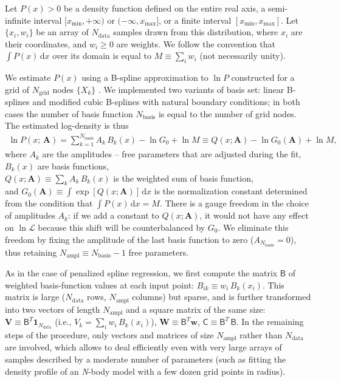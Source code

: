 \documentclass[12pt]{article}
\newcommand{\Nbody}{\textsl{N}-body\xspace}
\renewcommand{\d}{\mathrm{d}}
\newcommand{\bA}{\boldsymbol{A}}
\begin{document}
Let $P(x)>0$ be a density function defined on the entire real axis, a semi-infinite interval $[x_\mathrm{min},+\infty)$ or $(-\infty,x_\mathrm{max}]$, or a finite interval $[x_\mathrm{min},x_\mathrm{max}]$.
Let $\{x_i, w_i\}$ be an array of $N_\mathrm{data}$ samples drawn from this distribution, where $x_i$ are their coordinates, and $w_i\ge 0$ are weights. We follow the convention that $\int P(x)\,\d x$ over its domain is equal to $M\equiv \sum_i w_i$ (not necessarily unity).

We estimate $P(x)$ using a B-spline approximation to $\ln P$ constructed for a grid of $N_\mathrm{grid}$ nodes $\{X_k\}$ \cite{OSullivan1988}. We implemented two variants of basis set: linear B-splines and modified cubic B-splines with natural boundary conditions; in both cases the number of basis function $N_\mathrm{basis}$ is equal to the number of grid nodes. The estimated log-density is thus
\begin{align}
\ln P(x;\,\bA) = \sum_{k=1}^{N_\mathrm{basis}}  A_k\, B_k(x) - \ln G_0 + \ln M \equiv Q(x; \bA) - \ln G_0(\bA) + \ln M ,
\end{align}
where $A_k$ are the amplitudes -- free parameters that are adjusted during the fit,\\
$B_k(x)$  are  basis functions,\\
$Q(x; \bA) \equiv \sum_k  A_k\, B_k(x)$  is the weighted sum of basis function, \\
and $G_0(\bA) \equiv \int \exp[Q(x; \bA)]\, \d x$  is the normalization constant determined from the condition that $\int P(x)\,\d x = M$.
There is a gauge freedom in the choice of amplitudes $A_k$: if we add a constant to $Q(x; \bA)$, it would not have any effect on $\ln\mathcal{L}$ because this shift will be counterbalanced by $G_0$. We eliminate this freedom by fixing the amplitude of the last basis function to zero ($A_{N_\mathrm{basis}}=0$), thus retaining $N_\mathrm{ampl}\equiv N_\mathrm{basis}-1$ free parameters.

As in the case of penalized spline regression, we first compute the matrix $\mathsf{B}$ of weighted basis-function values at each input point: $B_{ik} \equiv w_i\,B_k(x_i)$. This matrix is large ($N_\mathrm{data}$ rows, $N_\mathrm{ampl}$ columns) but sparse, and is further transformed into two vectors of length $N_\mathrm{ampl}$ and a square matrix of the same size:
$\boldsymbol{V} \equiv \mathsf{B}^T\boldsymbol{1}_{N_\mathrm{data}}$ (i.e., $V_k = \sum_i w_i\,B_k(x_i)$), $\boldsymbol{W} \equiv \mathsf{B}^T\boldsymbol{w}$, $\mathsf{C} \equiv \mathsf{B}^T\,\mathsf{B}$. In the remaining steps of the procedure, only vectors and matrices of size $N_\mathrm{ampl}$ rather than $N_\mathrm{data}$ are involved, which allows to deal efficiently even with very large arrays of samples described by a moderate number of parameters (such as fitting the density profile of an \Nbody model with a few dozen grid points in radius).
\end{document}
